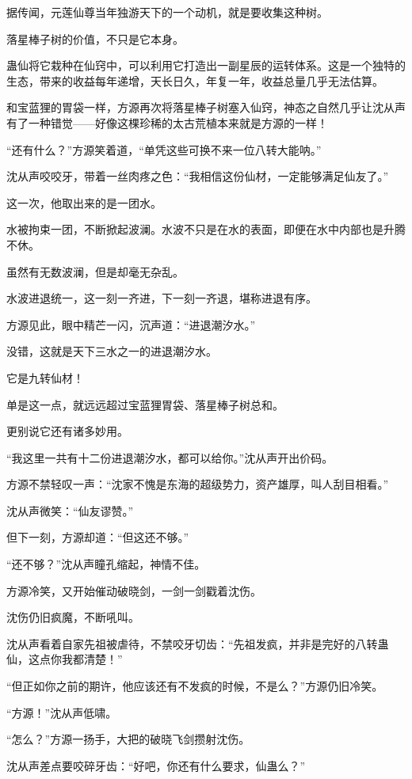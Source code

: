 \begin{this_body}
据传闻，元莲仙尊当年独游天下的一个动机，就是要收集这种树。

落星棒子树的价值，不只是它本身。

蛊仙将它栽种在仙窍中，可以利用它打造出一副星辰的运转体系。这是一个独特的生态，带来的收益每年递增，天长日久，年复一年，收益总量几乎无法估算。

和宝蓝狸的胃袋一样，方源再次将落星棒子树塞入仙窍，神态之自然几乎让沈从声有了一种错觉——好像这棵珍稀的太古荒植本来就是方源的一样！

“还有什么？”方源笑着道，“单凭这些可换不来一位八转大能呐。”

沈从声咬咬牙，带着一丝肉疼之色：“我相信这份仙材，一定能够满足仙友了。”

这一次，他取出来的是一团水。

水被拘束一团，不断掀起波澜。水波不只是在水的表面，即便在水中内部也是升腾不休。

虽然有无数波澜，但是却毫无杂乱。

水波进退统一，这一刻一齐进，下一刻一齐退，堪称进退有序。

方源见此，眼中精芒一闪，沉声道：“进退潮汐水。”

没错，这就是天下三水之一的进退潮汐水。

它是九转仙材！

单是这一点，就远远超过宝蓝狸胃袋、落星棒子树总和。

更别说它还有诸多妙用。

“我这里一共有十二份进退潮汐水，都可以给你。”沈从声开出价码。

方源不禁轻叹一声：“沈家不愧是东海的超级势力，资产雄厚，叫人刮目相看。”

沈从声微笑：“仙友谬赞。”

但下一刻，方源却道：“但这还不够。”

“还不够？”沈从声瞳孔缩起，神情不佳。

方源冷笑，又开始催动破晓剑，一剑一剑戳着沈伤。

沈伤仍旧疯魔，不断吼叫。

沈从声看着自家先祖被虐待，不禁咬牙切齿：“先祖发疯，并非是完好的八转蛊仙，这点你我都清楚！”

“但正如你之前的期许，他应该还有不发疯的时候，不是么？”方源仍旧冷笑。

“方源！”沈从声低啸。

“怎么？”方源一扬手，大把的破晓飞剑攒射沈伤。

沈从声差点要咬碎牙齿：“好吧，你还有什么要求，仙蛊么？”


\end{this_body}
